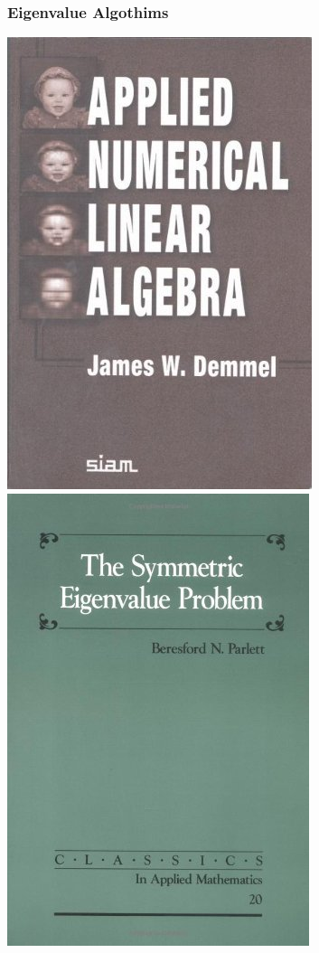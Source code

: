 \begin{frame}
  \frametitle{Eigenvalue Algothims}
  \begin{center}
    \includegraphics[height=0.45\textheight]{figure/AppliedNumericalLinearAlgebra.jpg} \ \
    \includegraphics[height=0.45\textheight]{figure/TheSymmetricEigenvalueProblem.jpg} \ \

\end{center}
\end{frame}
